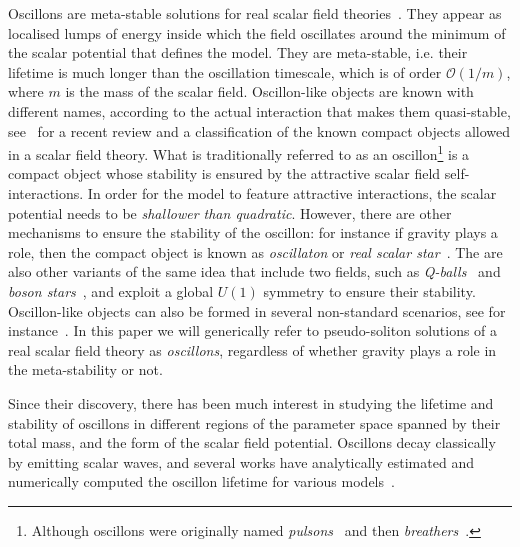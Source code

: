 \documentclass[11pt,a4paper]{article}
\begin{document}
Oscillons are meta-stable solutions for real scalar field theories~\cite{Bogolyubsky:1976yu, hep-ph/9308279, hep-ph/9503217, hep-ph/0209358}. They appear as localised lumps of energy inside which the field oscillates around the minimum of the scalar potential that defines the model. They are meta-stable, i.e. their lifetime is much longer than the oscillation timescale, which is of order $\mathcal{O}(1/m)$, where $m$ is the mass of the scalar field. Oscillon-like objects are known with different names, according to the actual interaction that makes them quasi-stable, see~\cite{1806.04690} for a recent review and a classification of the known compact objects allowed in a scalar field theory. What is traditionally referred to as an oscillon\footnote{Although oscillons were originally named \textit{pulsons}~\cite{Bogolyubsky:1976yu} and then \textit{breathers}~\cite{Segur:1987mg}.} is a compact object whose stability is ensured by the attractive scalar field self-interactions. In order for the model to feature attractive interactions, the scalar potential needs to be \textit{shallower than quadratic}. However, there are other mechanisms to ensure the stability of the oscillon: for instance if gravity plays a role, then the compact object is known as \textit{oscillaton} or \textit{real scalar star}~\cite{gr-qc/0301105, gr-qc/0104093, UrenaLopez:2002gx, UrenaLopez:2012zz}. The are also other variants of the same idea that include two fields, such as \textit{Q-balls}~\cite{Coleman:1985ki} and \textit{boson stars}~\cite{Jetzer:1991jr}, and exploit a global $U(1)$ symmetry to ensure their stability. Oscillon-like objects can also be formed in several non-standard scenarios, see for instance~\cite{hep-th/0610267, 0808.0514, 1210.7568, Antusch:2015ziz, Amin:2013ika, 1809.07724}. In this paper we will generically refer to pseudo-soliton solutions of a real scalar field theory as \textit{oscillons}, regardless of whether gravity plays a role in the meta-stability or not.

Since their discovery, there has been much interest in studying the lifetime and stability of oscillons in different regions of the parameter space spanned by their total mass, and the form of the scalar field potential. Oscillons decay classically by emitting scalar waves, and several works have analytically estimated and numerically computed the oscillon lifetime for various models~\cite{Segur:1987mg, Piette:1997hf, 0812.1919, 0903.0953, 0910.5922, 1003.3459, 1201.1934, 1210.2227, 1612.07750, 1901.06130, 1906.04070, Antusch:2019qrr, 1908.11103, 1911.03340, 2003.10899, Zhang:2020bec}. 
\end{document}
